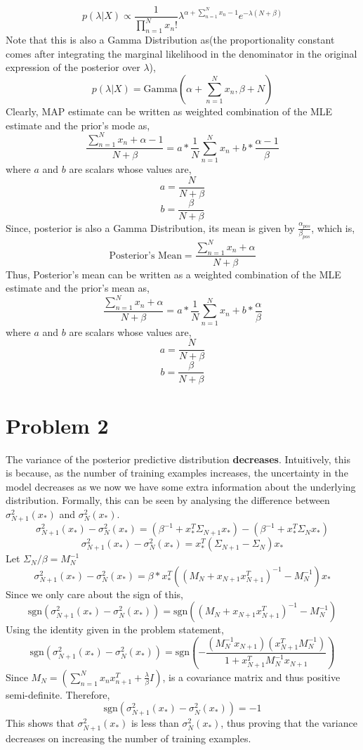\documentclass{article}
\begin{document}
$$p(\lambda|X) \propto  \frac{1}{\prod_{n=1}^{N}x_n!} \lambda^{\alpha + \sum_{n=1}^Nx_n -1}e^{-\lambda(N+\beta)}$$
Note that this is also a Gamma Distribution as(the proportionality constant comes after integrating the marginal likelihood in the denominator in the original expression of the posterior over $\lambda$), 
$$p(\lambda|X) = \text{Gamma}(\alpha + \sum_{n=1}^Nx_n, \beta + N)$$
Clearly, MAP estimate can be written as weighted combination of the MLE estimate and the prior's mode as,
$$\frac{\sum_{n=1}^Nx_n + \alpha-1}{N+\beta} = a*\frac{1}{N}\sum_{n=1}^Nx_n + b*\frac{\alpha-1}{\beta}$$
where $a$ and $b$ are scalars whose values are,
$$a = \frac{N}{N+\beta}$$
$$b = \frac{\beta}{N+\beta}$$
Since, posterior is also a Gamma Distribution, its mean is given by $\frac{\alpha_{pos}}{\beta_{pos}}$, which is,
$$\text{Posterior's Mean} = \frac{\sum_{n=1}^{N}x_n+ \alpha}{N+\beta}$$ 
Thus, Posterior's mean can be written as a weighted combination of the MLE estimate and the prior's mean as,
$$\frac{\sum_{n=1}^Nx_n + \alpha}{N+\beta} = a*\frac{1}{N}\sum_{n=1}^Nx_n + b*\frac{\alpha}{\beta}$$
where $a$ and $b$ are scalars whose values are,
$$a = \frac{N}{N+\beta}$$
$$b = \frac{\beta}{N+\beta}$$
\section*{Problem 2}
The variance of the posterior predictive distribution \textbf{decreases}. Intuitively, this is because, as the number of training examples increases, the uncertainty in the model decreases as we now we have some extra information about the underlying distribution. Formally, this can be seen by analysing the difference between $\sigma^2_{N+1}(x_*)$ and $\sigma^2_{N}(x_*)$.
$$\sigma^2_{N+1}(x_*) - \sigma^2_{N}(x_*) = (\beta^{-1} + x_*^{T}\Sigma_{N+1}x_*) - (\beta^{-1} + x_*^{T}\Sigma_{N}x_*)$$
$$\sigma^2_{N+1}(x_*) - \sigma^2_{N}(x_*) = x_*^{T}(\Sigma_{N+1} - \Sigma_N)x_* $$
Let $\Sigma_N/\beta = M_N^{-1}$ 
$$\sigma^2_{N+1}(x_*) - \sigma^2_{N}(x_*) = \beta*x_*^{T}((M_{N}+x_{N+1}x_{N+1}^T)^{-1} - M_N^{-1})x_* $$
Since we only care about the sign of this,
$$\text{sgn}(\sigma^2_{N+1}(x_*) - \sigma^2_{N}(x_*)) = \text{sgn}((M_{N}+x_{N+1}x_{N+1}^T)^{-1} - M_N^{-1}) $$
Using the identity given in the problem statement, 
$$\text{sgn}(\sigma^2_{N+1}(x_*) - \sigma^2_{N}(x_*)) = \text{sgn}(-\frac{(M_N^{-1}x_{N+1})(x_{N+1}^{T} M_N^{-1})}{1+x_{N+1}^TM_N^{-1}x_{N+1}}) $$
Since $M_N = (\sum_{n=1}^{N}x_nx_{n+1}^T + \frac{\lambda}{\beta
}I)$, is a covariance matrix and thus positive semi-definite. Therefore, 
$$\text{sgn}(\sigma^2_{N+1}(x_*) - \sigma^2_{N}(x_*)) = -1 $$
This shows that $\sigma^2_{N+1}(x_*)$ is less than $\sigma^2_{N}(x_*)$, thus proving that the variance decreases on increasing the number of training examples.
\end{document}
